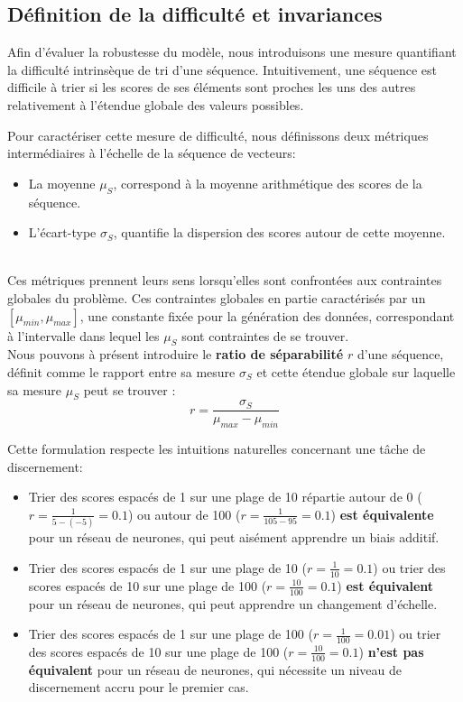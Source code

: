 \subsection{Définition de la difficulté et invariances}
Afin d'évaluer la robustesse du modèle, nous introduisons une mesure quantifiant la difficulté intrinsèque de tri d'une séquence. Intuitivement, une séquence est difficile à trier si les scores de ses éléments sont proches les uns des autres relativement à l'étendue globale des valeurs possibles.

Pour caractériser cette mesure de difficulté, nous définissons deux métriques intermédiaires à l'échelle de la séquence de vecteurs:
\begin{itemize}
    \item La moyenne $\mu_S$, correspond à la moyenne arithmétique des scores de la séquence.
    \item L'écart-type $\sigma_S$, quantifie la dispersion des scores autour de cette moyenne.
\end{itemize}
\: \\

Ces métriques prennent leurs sens lorsqu'elles sont confrontées aux contraintes globales du problème. Ces contraintes globales en partie caractérisés par un $[\mu_{min}, \mu_{max}]$, une constante fixée pour la génération des données, correspondant à l'intervalle dans lequel les $\mu_S$ sont contraintes de se trouver. \\ 

Nous pouvons à présent introduire le \textbf{ratio de séparabilité} $r$ d'une séquence, définit comme le rapport entre sa mesure $\sigma_S$  et cette étendue globale sur laquelle sa mesure $\mu_S$ peut se trouver :
\begin{equation}
\label{eq:sep}
r = \frac{\sigma_S}{\mu_{max} - \mu_{min}}
\end{equation}

Cette formulation respecte les intuitions naturelles concernant une tâche de discernement:
\begin{itemize}
    \item Trier des scores espacés de 1 sur une plage de 10 répartie autour de 0 ($r=\frac{1}{5 - (-5)} = 0.1$) ou autour de 100 ($r=\frac{1}{105 - 95} = 0.1$) \textbf{est équivalente} pour un réseau de neurones, qui peut aisément apprendre un biais additif.
    \item Trier des scores espacés de 1 sur une plage de 10 ($r=\frac{1}{10} = 0.1$) ou trier des scores espacés de 10 sur une plage de 100 ($r=\frac{10}{100} = 0.1$) \textbf{est équivalent} pour un réseau de neurones, qui peut apprendre un changement d'échelle.
    \item Trier des scores espacés de 1 sur une plage de 100 ($r=\frac{1}{100} = 0.01$) ou trier des scores espacés de 10 sur une plage de 100 ($r=\frac{10}{100} = 0.1$) \textbf{n'est pas équivalent} pour un réseau de neurones, qui nécessite un niveau de discernement accru pour le premier cas.
\end{itemize}
\: \\

